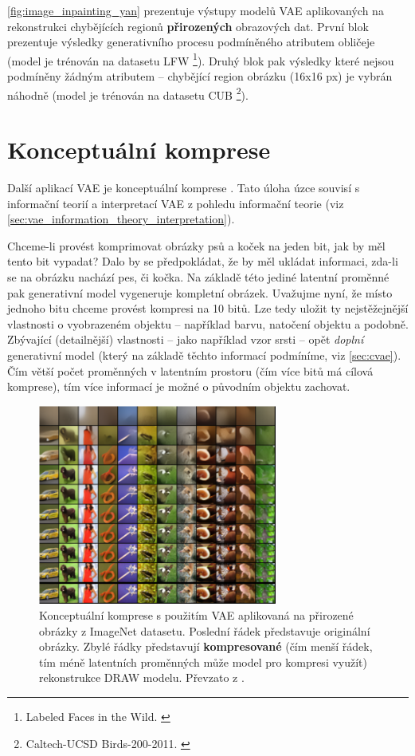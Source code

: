 \autoref{fig:image_inpainting_yan} prezentuje výstupy modelů VAE aplikovaných na rekonstrukci chybějících regionů \textbf{přirozených} obrazových dat.
První blok prezentuje výsledky generativního procesu podmíněného atributem obličeje (model je trénován na datasetu LFW \footnote{Labeled Faces in the Wild. \cite{Huang2012}}).
Druhý blok pak výsledky které nejsou podmíněny žádným atributem – chybějící region obrázku (16x16 px) je vybrán náhodně (model je trénován na datasetu CUB \footnote{Caltech-UCSD Birds-200-2011. \cite{Wah2011}}).

\newpage
\section{Konceptuální komprese}
Další aplikací VAE je konceptuální komprese \cite{Gregor2016}. Tato úloha úzce souvisí s informační teorií a interpretací VAE z pohledu informační teorie (viz \autoref{sec:vae_information_theory_interpretation}).

Chceme-li provést komprimovat obrázky psů a koček na jeden bit, jak by měl tento bit vypadat?
Dalo by se předpokládat, že by měl ukládat informaci, zda-li se na obrázku nachází pes, či kočka. 
Na základě této jediné latentní proměnné pak generativní model vygeneruje kompletní obrázek.
Uvažujme nyní, že místo jednoho bitu chceme provést kompresi na 10 bitů.
Lze tedy uložit ty nejstěžejnější vlastnosti o vyobrazeném objektu  – například barvu, natočení objektu a podobně.
Zbývající (detailnější) vlastnosti – jako například vzor srsti – opět \emph{doplní} generativní model (který na základě těchto informací podmíníme, viz \autoref{sec:cvae}).
Čím větší počet proměnných v latentním prostoru (čím více bitů má cílová komprese), tím více informací je možné o původním objektu zachovat. \cite{Gregor2016}

\begin{figure}[H]
    \centering
    \includegraphics[width=0.70\textwidth]{figures/applications/conceptual_compression_gregor.png}
    \caption{Konceptuální komprese s použitím VAE aplikovaná na přirozené obrázky z ImageNet datasetu. Poslední řádek představuje originální obrázky. Zbylé řádky představují \textbf{kompresované} (čím menší řádek, tím méně latentních proměnných může model pro kompresi využít) rekonstrukce DRAW modelu. Převzato z \cite{Gregor2016}.}
    \label{fig:conceptual_compression_gregor}
\end{figure}

